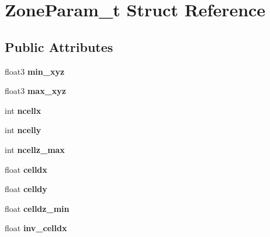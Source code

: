 \hypertarget{structZoneParam__t}{}\section{Zone\+Param\+\_\+t Struct Reference}
\label{structZoneParam__t}
\subsection*{Public Attributes}
\begin{DoxyCompactItemize}
\item 
\hypertarget{structZoneParam__t_abff7685c795f227d3b907808f618f08d}{}\label{structZoneParam__t_abff7685c795f227d3b907808f618f08d} 
float3 {\bfseries min\+\_\+xyz}
\item 
\hypertarget{structZoneParam__t_ab4e04e5ddf111f093211fab26a52e9a3}{}\label{structZoneParam__t_ab4e04e5ddf111f093211fab26a52e9a3} 
float3 {\bfseries max\+\_\+xyz}
\item 
\hypertarget{structZoneParam__t_a1f2333a7146984d06e6536f6fa98c06d}{}\label{structZoneParam__t_a1f2333a7146984d06e6536f6fa98c06d} 
int {\bfseries ncellx}
\item 
\hypertarget{structZoneParam__t_af1076c526a40ed39204659fd28245534}{}\label{structZoneParam__t_af1076c526a40ed39204659fd28245534} 
int {\bfseries ncelly}
\item 
\hypertarget{structZoneParam__t_ae8cf566a5e1b3a1eaa0406ae74c9c7c6}{}\label{structZoneParam__t_ae8cf566a5e1b3a1eaa0406ae74c9c7c6} 
int {\bfseries ncellz\+\_\+max}
\item 
\hypertarget{structZoneParam__t_a90832f4b7094aa160a20a5a8ca288cde}{}\label{structZoneParam__t_a90832f4b7094aa160a20a5a8ca288cde} 
float {\bfseries celldx}
\item 
\hypertarget{structZoneParam__t_aa40ade23f3d19fd25e26540a0f00d666}{}\label{structZoneParam__t_aa40ade23f3d19fd25e26540a0f00d666} 
float {\bfseries celldy}
\item 
\hypertarget{structZoneParam__t_ac56f85238b3bef7020434e4517d0be81}{}\label{structZoneParam__t_ac56f85238b3bef7020434e4517d0be81} 
float {\bfseries celldz\+\_\+min}
\item 
\hypertarget{structZoneParam__t_aed894049e776cea3eabe3bef84aa0ae6}{}\label{structZoneParam__t_aed894049e776cea3eabe3bef84aa0ae6} 
float {\bfseries inv\+\_\+celldx}
\item 
\hypertarget{structZoneParam__t_a8b6441fbe8252a2844e20d9c4cc1df0d}{}\label{structZoneParam__t_a8b6441fbe8252a2844e20d9c4cc1df0d} 

\end{DoxyCompactItemize}
